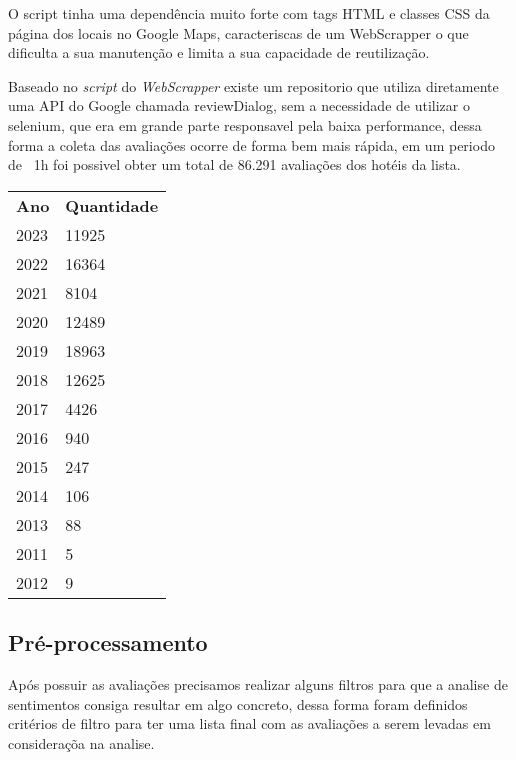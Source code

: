 O script tinha uma dependência muito forte com tags HTML e classes CSS da página dos locais no Google Maps, caracteriscas de um WebScrapper o que dificulta a sua manutenção e limita a sua capacidade de reutilização.

Baseado no \emph{script} do \emph{WebScrapper} existe um repositorio que utiliza diretamente uma API do Google chamada reviewDialog, sem a necessidade de utilizar o selenium, que era em grande parte responsavel pela baixa performance, dessa forma a coleta das avaliações ocorre de forma bem mais rápida, em um periodo de ~1h foi possivel obter um total de 86.291 avaliações dos hotéis da lista.

\begin{table}[H]
	\centering
	\begin{tabular}{l|l}
		\textbf{Ano} & \textbf{Quantidade} \\
		2023         & 11925               \\
		2022         & 16364               \\
		2021         & 8104                \\
		2020         & 12489               \\
		2019         & 18963               \\
		2018         & 12625               \\
		2017         & 4426                \\
		2016         & 940                 \\
		2015         & 247                 \\
		2014         & 106                 \\
		2013         & 88                  \\
		2011         & 5                   \\
		2012         & 9
	\end{tabular}%
\end{table}

\subsection{Pré-processamento}
\label{subsec:pre_processamento}

Após possuir as avaliações precisamos realizar alguns filtros para que a analise de sentimentos consiga resultar em algo concreto, dessa forma foram definidos critérios de filtro para ter uma lista final com as avaliações a serem levadas em consideraçõa na analise.

